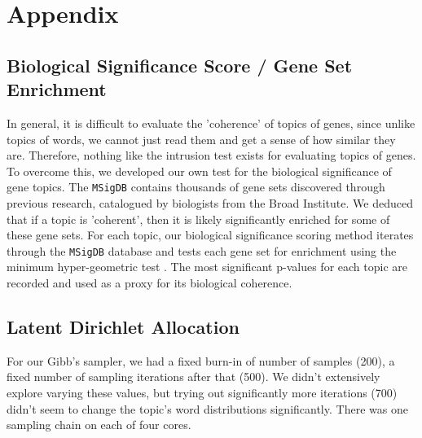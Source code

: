 \documentclass{article}
\begin{document}




\section{Appendix} 

\subsection{Biological Significance Score / Gene Set Enrichment} \label{enrichment_score}
In general, it is difficult to evaluate the 'coherence' of topics of genes, since unlike topics of words, we cannot just read them and get a sense of how similar they are. Therefore, nothing like the intrusion test exists for evaluating topics of genes. To overcome this, we developed our own test for the biological significance of gene topics. The \texttt{MSigDB} contains thousands of gene sets discovered through previous research, catalogued by biologists from the Broad Institute. We deduced that if a topic is 'coherent', then it is likely significantly enriched for some of these gene sets. For each topic, our biological significance scoring method iterates through the \texttt{MSigDB} database and tests each gene set for enrichment using the minimum hyper-geometric test \cite{hg}. The most significant p-values for each topic are recorded and used as a proxy for its biological coherence.

\subsection{Latent Dirichlet Allocation}
\label{ldaappendix}
For our Gibb's sampler, we had a fixed burn-in of number of samples (200), a fixed number of sampling iterations after that (500). We didn't extensively explore varying these values, but trying out significantly more iterations (700) didn't seem to change the topic's word distributions significantly. There was one sampling chain on each of four cores.
\end{document}
